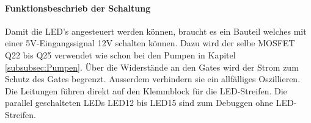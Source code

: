 \paragraph{Funktionsbeschrieb der Schaltung}\mbox{}

Damit die LED's angesteuert werden können, braucht es ein Bauteil welches mit einer 5V-Eingangssignal 12V schalten können. Dazu wird der selbe MOSFET Q22 bis Q25 verwendet wie schon bei den Pumpen in Kapitel \ref{subsubsec:Pumpen}. Über die Widerstände an den Gates wird der Strom zum Schutz des Gates begrenzt. Ausserdem verhindern sie ein allfälliges Oszillieren. Die Leitungen führen direkt auf den Klemmblock für die LED-Streifen. Die parallel geschalteten LEDs LED12 bis LED15 sind zum Debuggen ohne LED-Streifen.